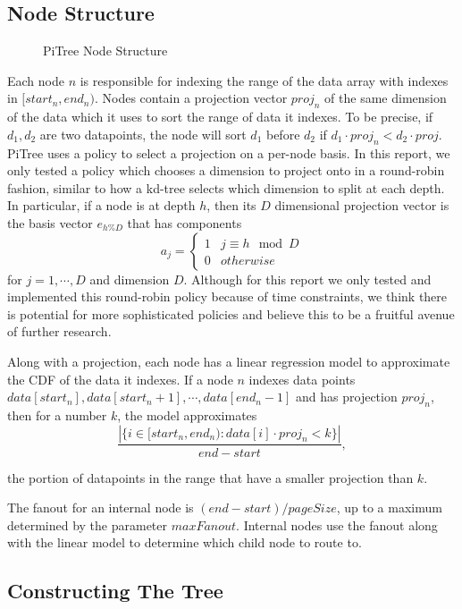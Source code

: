 \documentclass[sigconf,10pt]{acmart}
\begin{document}
\subsection{Node Structure}

\begin{figure}
  \caption{PiTree Node Structure}
  \label{PiTreeNode}
\end{figure}


Each node $n$ is responsible for indexing the range of the data array with indexes in $[start_n, end_n)$.
Nodes contain a projection vector $proj_n$ of the same dimension of the data
which it uses to sort the range of data it indexes. 
To be precise, if $d_1, d_2$ are two datapoints, the node will 
sort $d_1$ before $d_2$ if $d_1 \cdot proj_n < d_2 \cdot proj$.
PiTree uses a policy to select a projection on a per-node basis. In this report,
we only tested a policy which chooses a dimension to project onto in a round-robin
fashion, similar to how a kd-tree selects which dimension to split at each depth.
In particular, if a node is at depth $h$, then its
$D$ dimensional projection vector is the basis vector $e_{h \% D}$ that has components 
$$a_j = \begin{cases} 
  1 & j \equiv h \mod D \\
  0 & otherwise
\end{cases}
$$
for $j=1, \cdots, D$ and dimension $D$. Although for this report we only 
tested and implemented this round-robin policy because of time constraints,
we think there is potential
for more sophisticated policies and believe this to be a fruitful avenue of further
research.

Along with a projection, each node has a linear regression model 
to approximate the CDF of the data it indexes. If a node $n$ indexes data points
$data[start_n], data[start_n + 1], \cdots, data[end_n - 1]$ and has projection $proj_n$,
then for a number $k$, the
model approximates
\[ 
  \frac{|\{i \in [start_n, end_n) : data[i] \cdot proj_n < k\}|}{end - start},
\]

the portion of datapoints in the range that have a 
smaller projection than $k$.

The fanout for an internal node is $(end - start) / pageSize$, up to a maximum determined
by the parameter $maxFanout$. Internal nodes use the fanout along with the linear model
to determine which child node to route to.

\subsection{Constructing The Tree}
\end{document}
